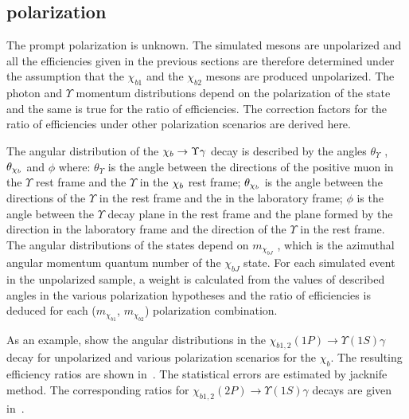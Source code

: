 \subsection{\texorpdfstring{\chib}{chib} polarization}
\label{sec:syst:pol}

The prompt \chib polarization is unknown. The simulated \chib mesons are
unpolarized and all the efficiencies given in the previous sections are
therefore determined under the assumption that the $\chi_{b1}$ and the
$\chi_{b2}$ mesons are produced unpolarized. The photon and $\Upsilon$ momentum
distributions depend on the polarization of the \chib state and the same is
true for the ratio of efficiencies. The correction factors for the ratio of
efficiencies under other polarization scenarios are derived here.

The angular distribution of the $\chi_{{b}} \rightarrow \Upsilon \gamma$ decay is described
by the angles $\theta_{\Upsilon}$ , $\theta_{\chi_{{b}}}$ and $\phi$ where:
$\theta_{\Upsilon}$ is the angle between the directions of the positive muon in
the $\Upsilon$ rest frame and the $\Upsilon$ in the $\chi_{{b}}$ rest frame;
$\theta_{\chi_{{b}}}$ is the angle between the directions of the $\Upsilon$ in the
\chib rest frame and the \chib in the laboratory frame; $\phi$ is the angle
between the $\Upsilon$ decay plane in the \chib rest frame and the plane formed
by the \chib direction in the laboratory frame and the direction of the
$\Upsilon$ in the \chib rest frame. The angular distributions of the
\chib states depend on $m_{\chi_{bJ}}$ , which is the azimuthal angular
momentum quantum number of the $\chi_{bJ}$ state. For each simulated event in
the unpolarized sample, a weight is calculated from the values of described
angles in the various polarization hypotheses and the ratio of efficiencies is
deduced for each ($m_{\chi_{b1}}$, $m_{\chi_{b2}}$) polarization combination.

As an example,  show the angular
distributions  in the $\chi_{b1,2}(1P)\to\Upsilon(1S)\gamma$
decay for unpolarized and various polarization scenarios for the $\chi_b$. The
resulting efficiency ratios are shown
in~. The statistical errors are estimated by
jacknife method\cite{jacknife,wouter}. The corresponding ratios for
$\chi_{b1,2}(2P) \to \Upsilon(1S) \gamma$ decays are given in~.






